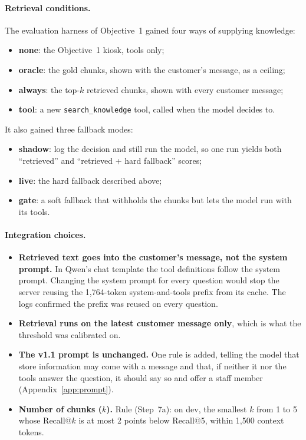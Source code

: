 \documentclass[11pt,a4paper]{article}
\begin{document}
\paragraph{Retrieval conditions.} The evaluation harness of Objective~1 gained four ways of supplying knowledge:
\begin{itemize}
  \item \textbf{none}: the Objective~1 kiosk, tools only;
  \item \textbf{oracle}: the gold chunks, shown with the customer's message, as a ceiling;
  \item \textbf{always}: the top-$k$ retrieved chunks, shown with every customer message;
  \item \textbf{tool}: a new \texttt{search\_knowledge} tool, called when the model decides to.
\end{itemize}
It also gained three fallback modes:
\begin{itemize}
  \item \textbf{shadow}: log the decision and still run the model, so one run yields both ``retrieved'' and ``retrieved +
        hard fallback'' scores;
  \item \textbf{live}: the hard fallback described above;
  \item \textbf{gate}: a soft fallback that withholds the chunks but lets the model run with its tools.
\end{itemize}

\paragraph{Integration choices.}
\begin{itemize}
  \item \textbf{Retrieved text goes into the customer's message, not the system prompt.} In Qwen's chat template the tool
        definitions follow the system prompt. Changing the system prompt for every question would stop the server
        reusing the 1,764-token system-and-tools prefix from its cache. The logs confirmed the prefix was reused on
        every question.
  \item \textbf{Retrieval runs on the latest customer message only}, which is what the threshold was calibrated on.
  \item \textbf{The v1.1 prompt is unchanged.} One rule is added, telling the model that store information may come with
        a message and that, if neither it nor the tools answer the question, it should say so and offer a staff member
        (Appendix~\ref{app:prompt}).
  \item \textbf{Number of chunks ($k$).} Rule (Step~7a): on dev, the smallest $k$ from 1 to 5 whose Recall@$k$ is at
        most 2 points below Recall@5, within 1,500 context tokens.
\end{itemize}
\end{document}
